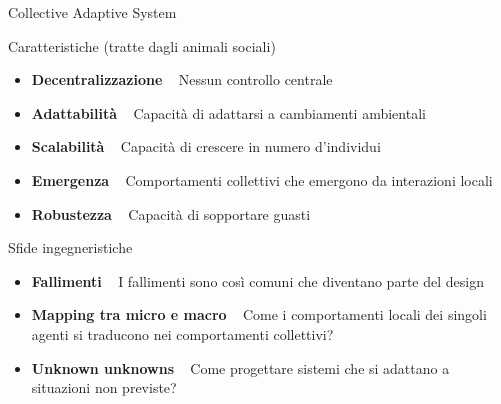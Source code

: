 \documentclass[presentation, 10pt,aspectratio=169]{beamer}\mode<presentation>{\usetheme{AMSBolognaFC}}
\begin{document}
\begin{frame}{Collective Adaptive System}
\begin{alertblock}{Caratteristiche (tratte dagli animali sociali)}
	\begin{itemize}
		\item \textbf{Decentralizzazione} \faArrowRight ~ Nessun controllo centrale
		\item \textbf{Adattabilità} \faArrowRight ~ Capacità di adattarsi a cambiamenti ambientali
		\item \textbf{Scalabilità} \faArrowRight ~ Capacità di crescere in numero d'individui 
		\item \textbf{Emergenza} \faArrowRight ~ Comportamenti collettivi che emergono da interazioni locali
		\item \textbf{Robustezza} \faArrowRight ~ Capacità di sopportare guasti
	\end{itemize}	
\end{alertblock}

\begin{exampleblock}{Sfide ingegneristiche}
	\begin{itemize}
		\item \textbf{Fallimenti} \faArrowRight ~ I fallimenti sono così comuni che diventano parte del design
		\item \textbf{Mapping tra micro e macro} \faArrowRight ~ Come i comportamenti locali dei singoli agenti si traducono nei comportamenti collettivi?
		\item \textbf{Unknown unknowns} \faArrowRight ~ Come progettare sistemi che si adattano a situazioni non previste?
	\end{itemize}
\end{exampleblock}
\end{frame}
\end{document}
